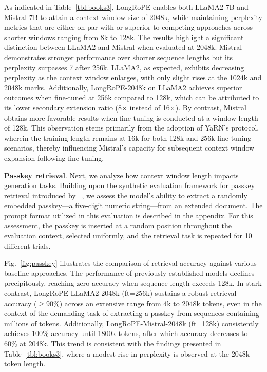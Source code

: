 As indicated in Table~\ref{tbl:books3}, LongRoPE enables both LLaMA2-7B and Mistral-7B to attain a context window size of 2048k, while maintaining perplexity metrics that are either on par with or superior to competing approaches across shorter windows ranging from 8k to 128k. The results highlight a significant distinction between LLaMA2 and Mistral when evaluated at 2048k. Mistral demonstrates stronger performance over shorter sequence lengths but its perplexity surpasses 7 after 256k. LLaMA2, as expected, exhibits decreasing perplexity as the context window enlarges, with only slight rises at the 1024k and 2048k marks. Additionally, LongRoPE-2048k on LLaMA2 achieves superior outcomes when fine-tuned at 256k compared to 128k, which can be attributed to its lower secondary extension ratio (8$\times$ instead of 16$\times$). By contrast, Mistral obtains more favorable results when fine-tuning is conducted at a window length of 128k. This observation stems primarily from the adoption of YaRN's protocol, wherein the training length remains at 16k for both 128k and 256k fine-tuning scenarios, thereby influencing Mistral's capacity for subsequent context window expansion following fine-tuning.

\textbf{Passkey retrieval}. Next, we analyze how context window length impacts generation tasks. Building upon the synthetic evaluation framework for passkey retrieval introduced by ~\cite{passkey}, we assess the model's ability to extract a randomly embedded passkey—a five-digit numeric string—from an extended document. The prompt format utilized in this evaluation is described in the appendix. For this assessment, the passkey is inserted at a random position throughout the evaluation context, selected uniformly, and the retrieval task is repeated for 10 different trials.

Fig.~\ref{fig:passkey} illustrates the comparison of retrieval accuracy against various baseline approaches. The performance of previously established models declines precipitously, reaching zero accuracy when sequence length exceeds 128k. In stark contrast, LongRoPE-LLaMA2-2048k (ft=256k) sustains a robust retrieval accuracy ($\ge$90\%) across an extensive range from 4k to 2048k tokens, even in the context of the demanding task of extracting a passkey from sequences containing millions of tokens. Additionally, LongRoPE-Mistral-2048k (ft=128k) consistently achieves 100\% accuracy until 1800k tokens, after which accuracy decreases to 60\% at 2048k. This trend is consistent with the findings presented in Table~\ref{tbl:books3}, where a modest rise in perplexity is observed at the 2048k token length.

